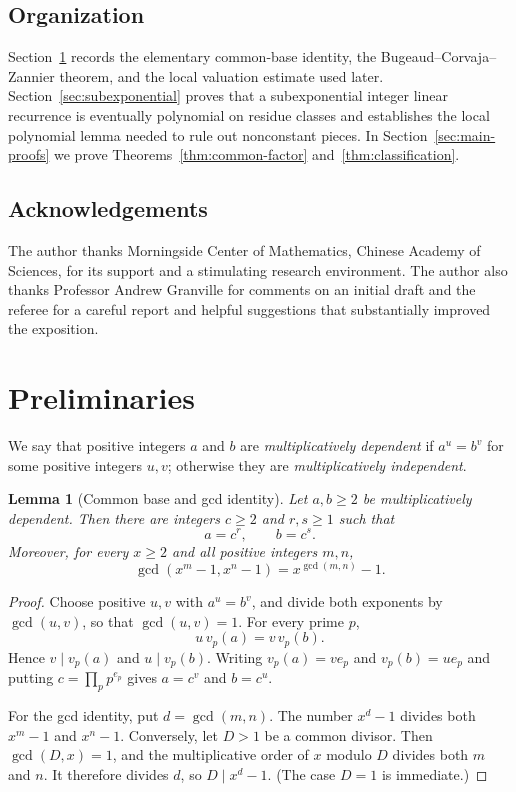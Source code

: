 \documentclass[11pt]{amsart}
\newtheorem{lemma}[theorem]{Lemma}
\theoremstyle{remark}
\numberwithin{equation}{section}
\begin{document}
\subsection*{Organization}
Section~\ref{sec:preliminaries} records the elementary common-base identity, the
Bugeaud--Corvaja--Zannier theorem, and the local valuation estimate used later.
Section~\ref{sec:subexponential} proves that a subexponential integer linear
recurrence is eventually polynomial on residue classes and establishes the local
polynomial lemma needed to rule out nonconstant pieces.  In
Section~\ref{sec:main-proofs} we prove Theorems~\ref{thm:common-factor}
and~\ref{thm:classification}.

\subsection*{Acknowledgements}
The author thanks Morningside Center of Mathematics, Chinese Academy of Sciences,
for its support and a stimulating research environment.  The author also thanks
Professor Andrew Granville for comments on an initial draft and the referee for a
careful report and helpful suggestions that substantially improved the exposition.

\section{Preliminaries}\label{sec:preliminaries}

We say that positive integers $a$ and $b$ are \emph{multiplicatively dependent} if
$a^u=b^v$ for some positive integers $u,v$; otherwise they are
\emph{multiplicatively independent}.

\begin{lemma}[Common base and gcd identity]\label{lem:common-base}
Let $a,b\ge 2$ be multiplicatively dependent.  Then there are integers
$c\ge 2$ and $r,s\ge 1$ such that
\[
  a=c^r,\qquad b=c^s.
\]
Moreover, for every $x\ge 2$ and all positive integers $m,n$,
\[
  \gcd(x^m-1,x^n-1)=x^{\gcd(m,n)}-1.
\]
\end{lemma}

\begin{proof}
Choose positive $u,v$ with $a^u=b^v$, and divide both exponents by
$\gcd(u,v)$, so that $\gcd(u,v)=1$.  For every prime $p$,
\[
  u\,v_p(a)=v\,v_p(b).
\]
Hence $v\mid v_p(a)$ and $u\mid v_p(b)$.  Writing
$v_p(a)=v e_p$ and $v_p(b)=u e_p$ and putting $c=\prod_p p^{e_p}$ gives
$a=c^v$ and $b=c^u$.

For the gcd identity, put $d=\gcd(m,n)$.  The number $x^d-1$ divides both
$x^m-1$ and $x^n-1$.  Conversely, let $D>1$ be a common divisor.  Then
$\gcd(D,x)=1$, and the multiplicative order of $x$ modulo $D$ divides both
$m$ and $n$.  It therefore divides $d$, so $D\mid x^d-1$.  (The case $D=1$
is immediate.)
\end{proof}
\end{document}
